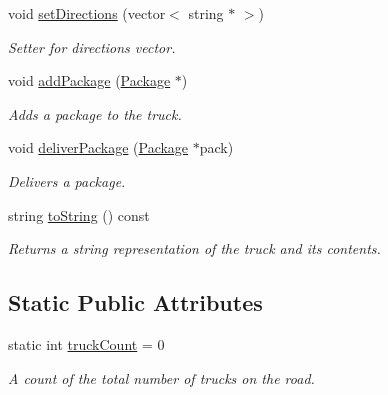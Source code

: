 \begin{DoxyCompactItemize}
void \hyperlink{classTruck_ad08c796603bfc23896abe4d71ac7a9ac}{set\+Directions} (vector$<$ string $\ast$ $>$)
\begin{DoxyCompactList}\small\item\em Setter for directions vector. \end{DoxyCompactList}\item 
void \hyperlink{classTruck_ad4c15f435c3e7f7851b7ffa018ac198e}{add\+Package} (\hyperlink{classPackage}{Package} $\ast$)
\begin{DoxyCompactList}\small\item\em Adds a package to the truck. \end{DoxyCompactList}\item 
void \hyperlink{classTruck_a51d480fbf34068dcd6512f8fd43aadf9}{deliver\+Package} (\hyperlink{classPackage}{Package} $\ast$pack)
\begin{DoxyCompactList}\small\item\em Delivers a package. \end{DoxyCompactList}\item 
string \hyperlink{classTruck_afc282688d1ad6a3ad79a0060c4e7d63c}{to\+String} () const 
\begin{DoxyCompactList}\small\item\em Returns a string representation of the truck and its contents. \end{DoxyCompactList}\end{DoxyCompactItemize}
\subsection*{Static Public Attributes}
\begin{DoxyCompactItemize}
\item 
static int \hyperlink{classTruck_a7435e6c1e97d263f36897f8ade5d4c41}{truck\+Count} = 0
\begin{DoxyCompactList}\small\item\em A count of the total number of trucks on the road. \end{DoxyCompactList}\end{DoxyCompactItemize}
